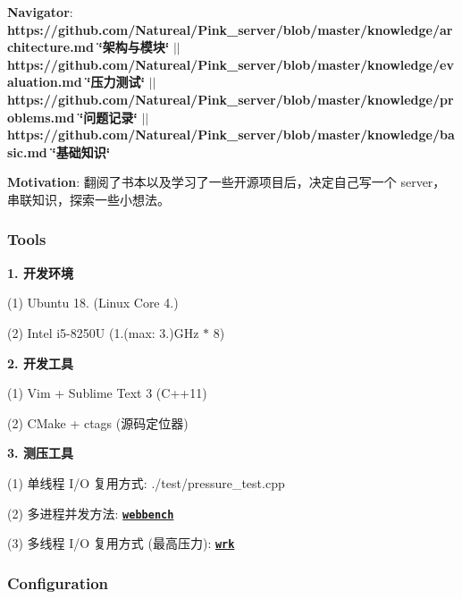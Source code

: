 {\bfseries Navigator}\+: {\bfseries https\+://github.com/\+Natureal/\+Pink\+\_\+server/blob/master/knowledge/architecture.\+md \char`\"{}架构与模块\char`\"{}} $\vert$$\vert$ {\bfseries https\+://github.com/\+Natureal/\+Pink\+\_\+server/blob/master/knowledge/evaluation.\+md \char`\"{}压力测试\char`\"{}} $\vert$$\vert$ {\bfseries https\+://github.com/\+Natureal/\+Pink\+\_\+server/blob/master/knowledge/problems.\+md \char`\"{}问题记录\char`\"{}} $\vert$$\vert$ {\bfseries https\+://github.com/\+Natureal/\+Pink\+\_\+server/blob/master/knowledge/basic.\+md \char`\"{}基础知识\char`\"{}}

{\bfseries Motivation}\+: 翻阅了书本以及学习了一些开源项目后，决定自己写一个 server，串联知识，探索一些小想法。 



\subsubsection*{Tools}


\begin{DoxyItemize}
\item {\bfseries 1. 开发环境}
\end{DoxyItemize}

(1) Ubuntu 18. (Linux Core 4.)

(2) Intel i5-\/8250U (1.(max\+: 3.)G\+Hz $\ast$ 8)


\begin{DoxyItemize}
\item {\bfseries 2. 开发工具}
\end{DoxyItemize}

(1) Vim + Sublime Text 3 (C++11)

(2) C\+Make + ctags (源码定位器)


\begin{DoxyItemize}
\item {\bfseries 3. 测压工具}
\end{DoxyItemize}

(1) 单线程 I/O 复用方式\+: ./test/pressure\+\_\+test.cpp

(2) 多进程并发方法\+: {\bfseries \href{http://home.tiscali.cz/~cz210552/webbench.html}{\tt webbench}}

(3) 多线程 I/O 复用方式 (最高压力)\+: {\bfseries \href{https://github.com/wg/wrk}{\tt wrk}} 



\subsubsection*{Configuration}


